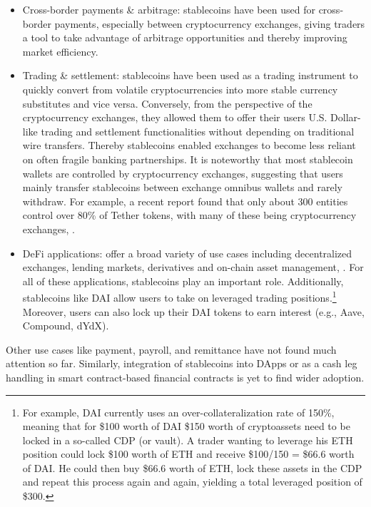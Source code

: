 \documentclass[conference]{IEEEtran}
\begin{document}
\begin{itemize}
	\item Cross-border payments \& arbitrage: stablecoins have been used for cross-border payments, especially between cryptocurrency exchanges, giving traders a tool to take advantage of arbitrage opportunities and thereby improving market efficiency.
	\item Trading \& settlement: stablecoins have been used as a trading instrument to quickly convert from volatile cryptocurrencies into more stable currency substitutes and vice versa. Conversely, from the perspective of the cryptocurrency exchanges, they allowed them to offer their users U.S. Dollar-like trading and settlement functionalities without depending on traditional wire transfers. Thereby stablecoins enabled exchanges to become less reliant on often fragile banking partnerships. It is noteworthy that most stablecoin wallets are controlled by cryptocurrency exchanges, suggesting that users mainly transfer stablecoins between exchange omnibus wallets and rarely withdraw. For example, a recent report found that only about 300 entities control over 80\% of Tether tokens, with many of these being cryptocurrency exchanges, \cite{Kharif}.
	\item \ac{DeFi} applications: offer a broad variety of use cases including decentralized exchanges, lending markets, derivatives and on-chain asset management, \cite{schaer:20}. For all of these applications, stablecoins play an important role. Additionally, stablecoins like DAI allow users to take on leveraged trading positions.\footnote{For example, DAI currently uses an over-collateralization rate of 150\%, meaning that for \$100 worth of DAI \$150 worth of cryptoassets need to be locked in a so-called \ac{CDP} (or vault).\cite{Maker} A trader wanting to leverage his ETH position could lock \$100 worth of ETH and receive \$100/150 = \$66.6 worth of DAI. He could then buy \$66.6 worth of ETH, lock these assets in the \ac{CDP} and repeat this process again and again, yielding a total leveraged position of \$300.} Moreover, users can also lock up their DAI tokens to earn interest (e.g., Aave, Compound, dYdX).
\end{itemize}

Other use cases like payment, payroll, and remittance have not found much attention so far. Similarly, integration of stablecoins into \acp{DApp} or as a cash leg handling in smart contract-based financial contracts is yet to find wider adoption.

\end{document}

